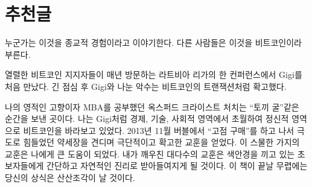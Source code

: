 \chapter*{추천글}

누군가는 이것을 종교적 경험이라고 이야기한다. 
다른 사람들은 이것을 비트코인이라 부른다.


열렬한 비트코인 지지자들이 매년 방문하는 라트비아 리가의 한 컨퍼런스에서 Gigi를 처음 만났다. 
긴 점심 후 Gigi와 나눈 악수는 비트코인의 트랜잭션처럼 확고했다.


나의 영적인 고향이자 MBA를 공부했던 옥스퍼드 크라이스트 처치는 \enquote{토끼 굴}같은 순간을 보낸 곳이다.
나는 Gigi처럼 경제, 기술, 사회적 영역에서 초월하여 정신적 영역으로 비트코인을 바라보고 있었다. 
2013년 11월 버블에서 \enquote{고점 구매}를 하고 나서 극도로 힘들었던 약세장을 견디며 극단적이고 확고한 교훈을 얻었다.
이 스물한 가지의 교훈은 나에게 큰 도움이 되었다. 
내가 깨우친 대다수의 교훈은 색안경을 끼고 있는 초보자들에게 간단하고 자연적인 진리로 받아들여지게 될 것이다. 
이 책이 끝날 무렵에는 당신의 상식은 산산조각이 날 것이다.

